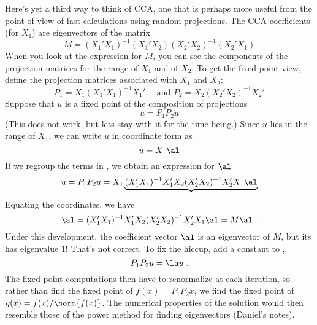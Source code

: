 \documentclass[12pt]{article}
\begin{document}
 Here's yet a third way to think of CCA, one that is perhaps more useful from
 the point of view of fast calculations using random projections.
 The CCA coefficients (for $X_1$) are eigenvectors of the matrix
 \begin{displaymath}
   M = (X_1'X_1)^{-1} (X_1'X_2) (X_2'X_2)^{-1} (X_2'X_1)     
 \end{displaymath}
 When you look at the expression for $M$, you can see the components of the
 projection matrices for the range of $X_1$ and of $X_2$.  To get the fixed
 point view, define the projection matrices associated with $X_1$ and $X_2$:
 \begin{displaymath}
   P_1 = X_1 (X_1'X_1)^{-1} X_1'  \quad \mbox{ and } P_2 = X_2 (X_2'X_2)^{-1} X_2'     
 \end{displaymath}
 Suppose that $u$ is a fixed point of the composition of projections
 \begin{equation}
    u = P_1 P_2 u
 \label{eq:fixedpoint}
 \end{equation}
 (This does not work, but lets stay with it for the time being.)  Since $u$ lies
 in the range of $X_1$, we can write $u$ in coordinate form as
 \begin{displaymath}
     u = X_1 \al
 \end{displaymath} 
 If we regroup the terms in , we obtain an expression for $\al$
 \begin{displaymath}
   u = P_1 P_2 u =  X_1 \underbrace{ (X_1'X_1)^{-1} X_1'X_2 (X_2'X_2)^{-1} X_2' X_1 \al }
 \end{displaymath}
 Equating the coordinates, we have
 \begin{displaymath}
    \al = (X_1'X_1)^{-1} X_1'X_2 (X_2'X_2)^{-1} X_2'X_1 \al = M \al \;.
 \end{displaymath}
 Under this development, the coefficient vector $\al$ is an eigenvector of $M$,
 but its has eigenvalue 1!  That's not correct. To fix the hiccup, add a
 constant to ,
 \begin{displaymath}
    P_1 P_2 u = \la u \;.   
 \end{displaymath}
 The fixed-point computations then have to renormalize at each iteration, so
 rather than find the fixed point of $f(x) = P_1 P_2 x$, we find the fixed point
 of $g(x) = f(x)/\norm{f(x)}$.  The numerical properties of the solution would then resemble
 those of the power method for finding eigenvectors (Daniel's notes).





\end{document}
